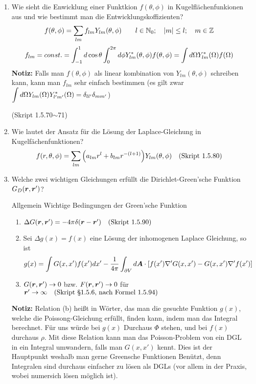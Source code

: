 \begin{enumerate}
  \item Wie sieht die Enwicklung einer Funktkion $f(\theta,\phi)$ in %
        Kugelflächenfunkionen aus und wie bestimmt man die 
        Entwicklungskoffizienten?
        $$\displaystyle f(\theta, \phi)=\sum_{lm} f_{lm}Y_{lm}(\theta,\phi)
        \qquad l\in \mathbb{N}_0;\quad \abs{m}\le l; 
        \quad m\in\mathbb{Z}$$
        $$\displaystyle f_{lm}=const.
         =\int_{-1}^{1} d\cos\theta\int_0^{2\pi}d\phi 
         Y^*_{lm}(\theta,\phi)f(\theta,\phi)
         =\int d\Omega Y^*_{lm}(\Omega)f(\Omega)$$
         \textbf{Notiz:} Falls man $f(\theta,\phi)$ als linear kombination
         von $Y_{lm}(\theta,\phi)$ schreiben kann, kann man $f_{lm}$
         sehr einfach bestimmen (es gilt zwar $\displaystyle \int d\Omega 
         Y_{lm}(\Omega)Y_{l'm'}^*(\Omega)=\delta_{ll'}\delta_{mm'}$)
        \begin{center}
          (Skript 1.5.70$\sim$71)
        \end{center}

  \item Wie lautet der Ansatz für die Lösung der Laplace-Gleichung in %
        Kugelfächenfunktionen?\\
        $$f(r,\theta,\phi)=
        \sum_{lm}\qty(a_{lm}r^l+b_{lm}r^{-(l+1)})Y_{lm}(\theta,\phi)
        \quad\text{(Skript 1.5.80)}$$
         
  \item Welche zwei wichtigen Gleichungen erfüllt die %
    Dirichlet-Green'sche
        Funktion $G_D(\vb* r, \vb* r')$?

        Allgemein Wichtige Bedingungen der Green'sche Funktion
        \begin{center}
          \begin{enumerate}
            \item $\Delta G(\vb* r, \vb* r') = -4\pi\delta(\vb* r -\vb* r')
              \quad\text{(Skript 1.5.90)}$
            \item Sei $\Delta g(x) = f(x)$ eine Lösung der inhomogenen  
              Laplace Gleichung, so ist 
              $$ g(x)=\int G(x,x')f(x')dx'
              -\frac{1}{4\pi}\int_{\partial V}d\vb*A\cdot
              \qty[f(x')\nabla' G(x,x') - G(x,x')\nabla' f(x')]$$
            \item $G(\vb* r, \vb* r') \to 0$ bzw. $F(\vb* r, \vb* r')\to 0$ 
              für $\vb* r'\to\infty 
              \quad\text{(Skript §1.5.6, nach Formel 1.5.94)}$
          \end{enumerate}
        \end{center}
        \textbf{Notiz:} Relation (b) heißt in Wörter, das man die gesuchte
        Funktion $g(x)$, welche die Poissong-Gleichung erfüllt, finden
        kann, indem man das Integral berechnet. Für uns würde bei $g(x)$
        Durchaus $\Phi$ stehen, und bei $f(x)$ durchaus $\rho$.
        Mit diese Relation kann man das 
        Poisson-Problem
        von ein DGL in ein Integral umwandern, falls man $G(x,x')$ kennt.
        Dies ist der Hauptpunkt weshalb man gerne Greensche Funktionen
        Benützt, denn Integralen sind durchaus einfacher 
        zu lösen als DGLs (vor allem in der Praxis, wobei numersich
        lösen möglich ist).


\end{enumerate}
